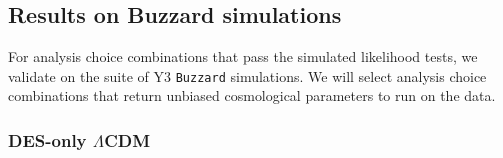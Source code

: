 \documentclass[fleqn,usenatbib]{mnras}
\newcommand{\gammat}{\ensuremath{\gamma_{t}(\theta)}}
\newcommand{\wtheta}{\ensuremath{w(\theta)}}
\newcommand{\lcdm}{$\Lambda$CDM}
\newcommand{\wcdm}{$w$CDM}
\newcommand{\buzzard}{\texttt{Buzzard} }
\begin{document}




\subsection{Results on Buzzard simulations}

For  analysis choice combinations that pass the simulated likelihood tests, we validate on the suite of Y3 \buzzard simulations. We will select analysis choice combinations that return unbiased cosmological parameters to run on the data. 

\subsubsection{DES-only \lcdm}

\end{document}
